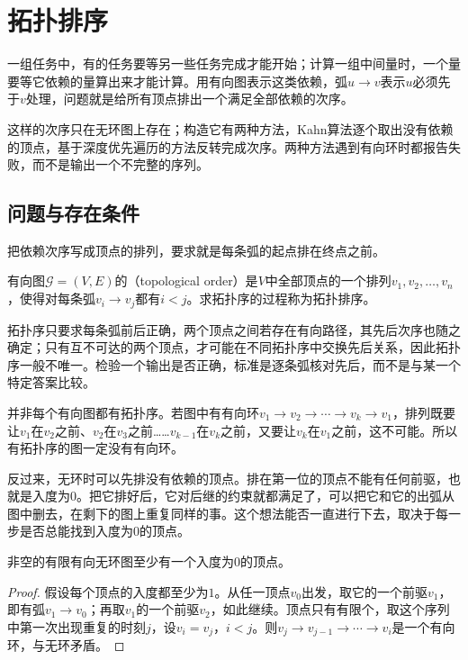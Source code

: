 \section{拓扑排序}
\label{sec:graph-topological-order}

一组任务中，有的任务要等另一些任务完成才能开始；计算一组中间量时，一个量要等它依赖的量算出来才能计算。用有向图表示这类依赖，弧$u\to v$表示$u$必须先于$v$处理，问题就是给所有顶点排出一个满足全部依赖的次序。

这样的次序只在无环图上存在；构造它有两种方法，Kahn算法逐个取出没有依赖的顶点，基于深度优先遍历的方法反转完成次序。两种方法遇到有向环时都报告失败，而不是输出一个不完整的序列。

\subsection{问题与存在条件}
\label{sec:graph-trav-topo-problem}

把依赖次序写成顶点的排列，要求就是每条弧的起点排在终点之前。

\begin{definition}[拓扑序]
\label{def:graph-trav-topological-order}
有向图$\mathcal G=(V,E)$的（topological order）是$V$中全部顶点的一个排列$v_1,v_2,\ldots,v_n$，使得对每条弧$v_i\to v_j$都有$i<j$。求拓扑序的过程称为拓扑排序。
\end{definition}

拓扑序只要求每条弧前后正确，两个顶点之间若存在有向路径，其先后次序也随之确定；只有互不可达的两个顶点，才可能在不同拓扑序中交换先后关系，因此拓扑序一般不唯一。检验一个输出是否正确，标准是逐条弧核对先后，而不是与某一个特定答案比较。

并非每个有向图都有拓扑序。若图中有有向环$v_1\to v_2\to\cdots\to v_k\to v_1$，排列既要让$v_1$在$v_2$之前、$v_2$在$v_3$之前……$v_{k-1}$在$v_k$之前，又要让$v_k$在$v_1$之前，这不可能。所以有拓扑序的图一定没有有向环。

反过来，无环时可以先排没有依赖的顶点。排在第一位的顶点不能有任何前驱，也就是入度为$0$。把它排好后，它对后继的约束就都满足了，可以把它和它的出弧从图中删去，在剩下的图上重复同样的事。这个想法能否一直进行下去，取决于每一步是否总能找到入度为$0$的顶点。

\begin{lemma}[有向无环图有源点]
\label{lem:graph-trav-dag-source}
非空的有限有向无环图至少有一个入度为$0$的顶点。
\end{lemma}

\begin{proof}
假设每个顶点的入度都至少为$1$。从任一顶点$v_0$出发，取它的一个前驱$v_1$，即有弧$v_1\to v_0$；再取$v_1$的一个前驱$v_2$，如此继续。顶点只有有限个，取这个序列中第一次出现重复的时刻$j$，设$v_i=v_j$，$i<j$。则$v_j\to v_{j-1}\to\cdots\to v_i$是一个有向环，与无环矛盾。
\end{proof}

